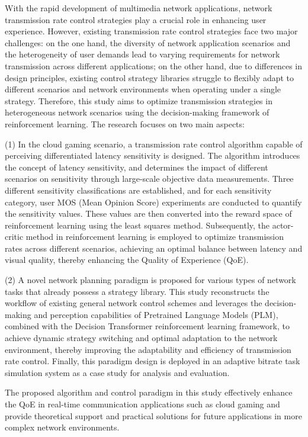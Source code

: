 \begin{abstract*}
  With the rapid development of multimedia network applications, network transmission rate control strategies play a crucial role in enhancing user experience. However, existing transmission rate control strategies face two major challenges: on the one hand, the diversity of network application scenarios and the heterogeneity of user demands lead to varying requirements for network transmission across different applications; on the other hand, due to differences in design principles, existing control strategy libraries struggle to flexibly adapt to different scenarios and network environments when operating under a single strategy. Therefore, this study aims to optimize transmission strategies in heterogeneous network scenarios using the decision-making framework of reinforcement learning. The research focuses on two main aspects:

(1) In the cloud gaming scenario, a transmission rate control algorithm capable of perceiving differentiated latency sensitivity is designed. The algorithm introduces the concept of latency sensitivity, and determines the impact of different scenarios on sensitivity through large-scale objective data measurements. Three different sensitivity classifications are established, and for each sensitivity category, user MOS (Mean Opinion Score) experiments are conducted to quantify the sensitivity values. These values are then converted into the reward space of reinforcement learning using the least squares method. Subsequently, the actor-critic method in reinforcement learning is employed to optimize transmission rates across different scenarios, achieving an optimal balance between latency and visual quality, thereby enhancing the Quality of Experience (QoE).

(2) A novel network planning paradigm is proposed for various types of network tasks that already possess a strategy library. This study reconstructs the workflow of existing general network control schemes and leverages the decision-making and perception capabilities of Pretrained Language Models (PLM), combined with the Decision Transformer reinforcement learning framework, to achieve dynamic strategy switching and optimal adaptation to the network environment, thereby improving the adaptability and efficiency of transmission rate control. Finally, this paradigm design is deployed in an adaptive bitrate task simulation system as a case study for analysis and evaluation.

The proposed algorithm and control paradigm in this study effectively enhance the QoE in real-time communication applications such as cloud gaming and provide theoretical support and practical solutions for future applications in more complex network environments.

\end{abstract*}
